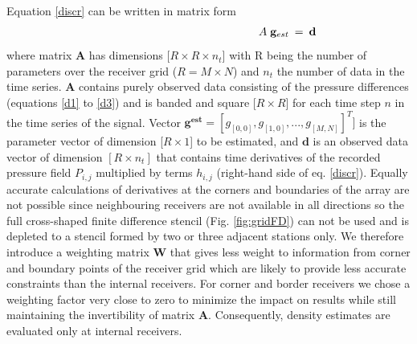 \documentclass[]{article}
\begin{document}
	Equation \eqref{discr} can be written in matrix form
	\begin{align}
	\shoveright \shoveright \shoveright \shoveright \shoveright \shoveright \shoveright \shoveright \shoveright \shoveright \shoveright \shoveright \shoveright \shoveright \shoveright
 			 \mathbf{A} \; \mathbf{g}_{est} &\: = \: \mathbf{d}
	\end{align}
	where matrix \textbf{A} has dimensions [$R \times R \times n_{t}$] with R being the number of parameters over the receiver grid ($R=M \times N$) and $n_{t}$ the number of data in the time series. \textbf{A} contains purely observed data consisting of the pressure differences (equations \ref{d1} to \ref{d3}) and is banded and square [$R \times R$] for each time step $n$ in the time series of the signal. Vector $ \mathbf{g^{est}} = [g_{[0,0]}, g_{[1,0]},..., g_{[M,N]}]^{T}]$ is the parameter vector of dimension [$R \times 1$] to be estimated, and $\mathbf{d}$ is an observed data vector of dimension $[R \times n_{t}]$ that contains time derivatives of the recorded pressure field $P_{i,j}$ multiplied by terms $h_{i,j}$ (right-hand side of eq. \ref{discr}). Equally accurate calculations of derivatives at the corners and boundaries of the array are not possible since neighbouring receivers are not available in all directions so the full cross-shaped finite difference stencil (Fig. \ref{fig:gridFD}) can not be used and is depleted to a stencil formed by two or three adjacent stations only. %
	We therefore introduce a weighting matrix $\mathbf{W}$ that gives less weight to information from corner and boundary points of the receiver grid which are likely to provide less accurate constraints than the internal receivers. For corner and border receivers we chose a weighting factor very close to zero to minimize the impact on results while still maintaining the invertibility of matrix $\mathbf{A}$. Consequently, density estimates are evaluated only at internal receivers. \\
	
\end{document}
